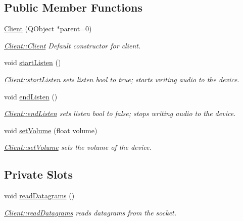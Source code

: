 \subsection*{Public Member Functions}
\begin{DoxyCompactItemize}
\item 
\hyperlink{class_client_a7832757f3fa37f564a21cb2b79b2baad}{Client} (Q\+Object $\ast$parent=0)
\begin{DoxyCompactList}\small\item\em \hyperlink{class_client_a7832757f3fa37f564a21cb2b79b2baad}{Client\+::\+Client} Default constructor for client. \end{DoxyCompactList}\item 
\hypertarget{class_client_a82ad726820ceb6332a603ea075c39105}{void \hyperlink{class_client_a82ad726820ceb6332a603ea075c39105}{start\+Listen} ()}\label{class_client_a82ad726820ceb6332a603ea075c39105}

\begin{DoxyCompactList}\small\item\em \hyperlink{class_client_a82ad726820ceb6332a603ea075c39105}{Client\+::start\+Listen} sets listen bool to true; starts writing audio to the device. \end{DoxyCompactList}\item 
\hypertarget{class_client_ad29f4f2cf64ca25ec2f7d092e6c9fd07}{void \hyperlink{class_client_ad29f4f2cf64ca25ec2f7d092e6c9fd07}{end\+Listen} ()}\label{class_client_ad29f4f2cf64ca25ec2f7d092e6c9fd07}

\begin{DoxyCompactList}\small\item\em \hyperlink{class_client_ad29f4f2cf64ca25ec2f7d092e6c9fd07}{Client\+::end\+Listen} sets listen bool to false; stops writing audio to the device. \end{DoxyCompactList}\item 
void \hyperlink{class_client_a1ff8c64a0e2e9563c7728990b16f720c}{set\+Volume} (float volume)
\begin{DoxyCompactList}\small\item\em \hyperlink{class_client_a1ff8c64a0e2e9563c7728990b16f720c}{Client\+::set\+Volume} sets the volume of the device. \end{DoxyCompactList}\end{DoxyCompactItemize}
\subsection*{Private Slots}
\begin{DoxyCompactItemize}
\item 
\hypertarget{class_client_abca3b984bee88e07ef8f81046e7398a9}{void \hyperlink{class_client_abca3b984bee88e07ef8f81046e7398a9}{read\+Datagrams} ()}\label{class_client_abca3b984bee88e07ef8f81046e7398a9}

\begin{DoxyCompactList}\small\item\em \hyperlink{class_client_abca3b984bee88e07ef8f81046e7398a9}{Client\+::read\+Datagrams} reads datagrams from the socket. \end{DoxyCompactList}\end{DoxyCompactItemize}
